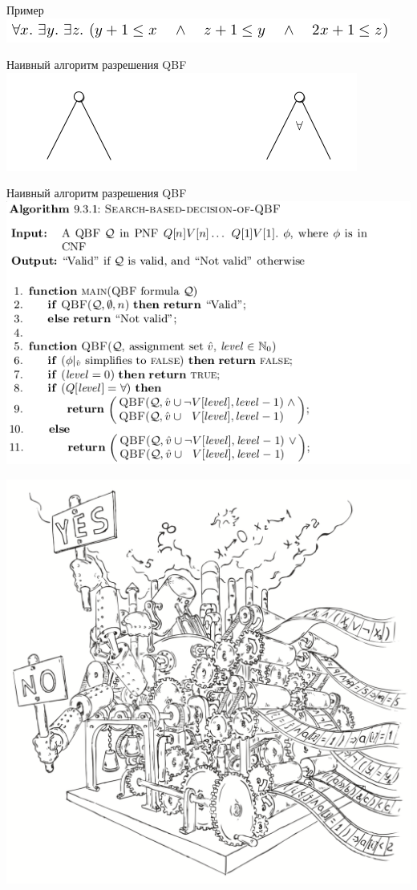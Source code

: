 \documentclass{beamer}
\begin{document}
\begin{frame}{Пример}
\includegraphics[scale=0.5]{linear_ex.png}\newline
\end{frame}

\begin{frame}{Наивный алгоритм разрешения QBF}
\includegraphics[scale=0.5]{cdcl1.png}\newline
\end{frame}

\begin{frame}{Наивный алгоритм разрешения QBF}
\includegraphics[scale=0.5]{cdcl2.png}\newline
\end{frame}

\begin{frame}
\includegraphics[scale=0.5]{../decision-procedure.png}
\end{frame}
\end{document}
